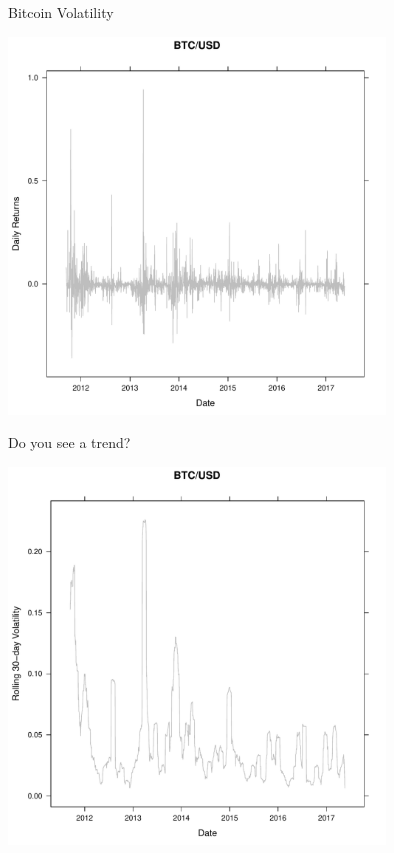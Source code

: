 \documentclass{beamer}
\begin{document}
\begin{frame}{Bitcoin Volatility}
  \begin{center}
    \includegraphics[keepaspectratio,width=0.75\textwidth]{btcror.pdf} 
  \end{center}
\end{frame}

\begin{frame}{Do you see a trend?}
  \begin{center}
    \includegraphics[keepaspectratio,width=0.75\textwidth]{btcvol.pdf} 
  \end{center}
\end{frame}
\end{document}

